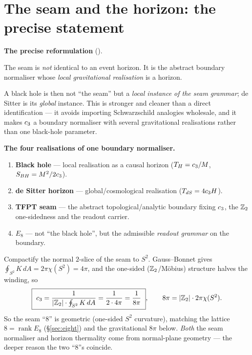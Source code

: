 \section{The seam and the horizon: the precise statement}\label{sec:crosslinks}
\par\smallskip\noindent\textbf{The precise reformulation} (\mC).
\begin{keyeq}
The seam is \emph{not} identical to an event horizon. It is the abstract boundary normaliser whose
\emph{local gravitational realisation} is a horizon.
\end{keyeq}
\noindent A black hole is then not ``the seam'' but a \emph{local instance of the seam grammar}; de Sitter is its
\emph{global} instance. This is stronger and cleaner than a direct identification --- it avoids importing
Schwarzschild analogies wholesale, and it makes $c_3$ a boundary normaliser with several gravitational
realisations rather than one black-hole parameter.

\noindent\textbf{The four realisations of one boundary normaliser.}
\begin{enumerate}[leftmargin=1.7em,itemsep=1pt]
\item \textbf{Black hole} --- local realisation as a causal horizon ($T_H=c_3/M$, $S_{BH}=M^2/2c_3$).
\item \textbf{de Sitter horizon} --- global/cosmological realisation ($T_{dS}=4c_3 H$).
\item \textbf{TFPT seam} --- the abstract topological/analytic boundary fixing $c_3$, the $\mathbb Z_2$
one-sidedness and the readout carrier.
\item \textbf{$E_8$} --- not ``the black hole'', but the admissible \emph{readout grammar} on the boundary.
\end{enumerate}

\begin{winbox}
Compactify the normal $2$-slice of the seam to $S^2$. Gauss--Bonnet gives
$\oint_{S^2}K\,dA=2\pi\chi(S^2)=4\pi$, and the one-sided ($\mathbb Z_2$/M\"obius) structure halves the winding, so
\[
  \boxed{\ \cthree=\frac{1}{|\Z_2|\cdot\oint_{S^2}K\,dA}=\frac{1}{2\cdot4\pi}=\frac1{8\pi}\ },\qquad
  8\pi=|\Z_2|\cdot2\pi\chi(S^2).
\]
So the seam ``$8$'' is geometric (one-sided $S^2$ curvature), matching the lattice $8=\operatorname{rank}E_8$
(\S\ref{sec:eight}) and the gravitational $8\pi$ below. \emph{Both} the seam normaliser and horizon
thermality come from normal-plane geometry --- the deeper reason the two ``$8$''s coincide.
\end{winbox}

